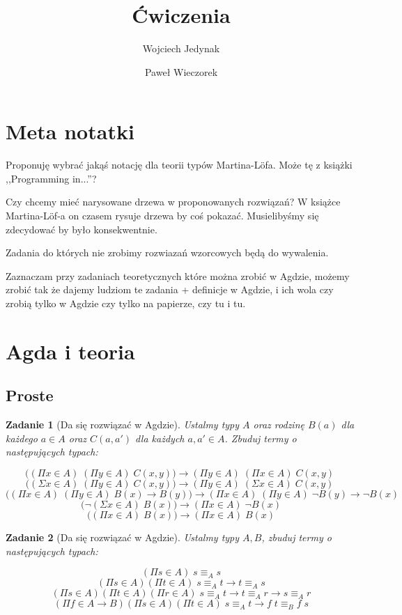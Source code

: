 \documentclass[11pt, a4paper]{article}
\author{Wojciech Jedynak \and Paweł Wieczorek}
\title{Ćwiczenia}
\newtheorem{zadanie}{Zadanie}
\begin{document}
\maketitle

\section*{Meta notatki}

Proponuję wybrać jakąś notację dla teorii typów Martina-L\"{o}fa. Może tę z książki ,,Programming in...''?

Czy chcemy mieć narysowane drzewa w proponowanych rozwiązań? W książce Martina-L\"{o}f-a on czasem rysuje drzewa
by coś pokazać. Musielibyśmy się zdecydować by było konsekwentnie.

Zadania do których nie zrobimy rozwiazań wzorcowych będą do wywalenia.

Zaznaczam przy zadaniach teoretycznych które można zrobić w Agdzie, możemy zrobić tak że dajemy ludziom te zadania
+ definicje w Agdzie, i ich wola czy zrobią tylko w Agdzie czy tylko na papierze, czy tu i tu.

\section{Agda i teoria}


\subsection{Proste}

\begin{zadanie}[Da się rozwiązać w Agdzie]
Ustalmy typy $A$ oraz rodzinę $B(a)$ dla każdego $a \in A$ oraz $C(a, a')$ dla każdych $a, a' \in A$.
Zbuduj termy o następujących typach:

\[
 \big( (\Pi x \in A)\;(\Pi y \in A)\; C(x, y) \big) \to (\Pi y \in A)\;(\Pi x \in A)\; C(x, y)\;
\]
\[
 \big( (\Sigma x \in A)\;(\Pi y \in A)\; C(x, y) \big) \to (\Pi y \in A)\;(\Sigma x \in A)\; C(x, y)\;
\]
\[
 \big( (\Pi x \in A)\;(\Pi y \in A)\;B(x) \to B(y)\big) \to (\Pi x \in A)\;(\Pi y \in A)\;\neg B(y) \to \neg B(x)
\]
\[
 \big( \neg (\Sigma x \in A)\;B(x)\big) \to (\Pi x \in A)\;\neg B(x)
\]
\[
 \big( (\Pi x \in A)\;B(x)\big) \to (\Pi x \in A)\;B(x)
\]
\end{zadanie}


\begin{zadanie}[Da się rozwiązać w Agdzie]
Ustalmy typy $A, B$, zbuduj termy o następujących typach:

\[
 (\Pi s \in A)\; s \equiv_A s
\]
\[
  (\Pi s \in A)(\Pi t \in A)\; s \equiv_A t \to t \equiv_A s
\]
\[
  (\Pi s \in A)(\Pi t \in A)(\Pi r \in A)\; s \equiv_A t \to t \equiv_A r \to s \equiv_A r
\]
\[
  (\Pi f \in A \to B)(\Pi s \in A)(\Pi t \in A)\; s \equiv_A t \to f\;t \equiv_B f\;s
\]

\end{zadanie}
\end{document}
